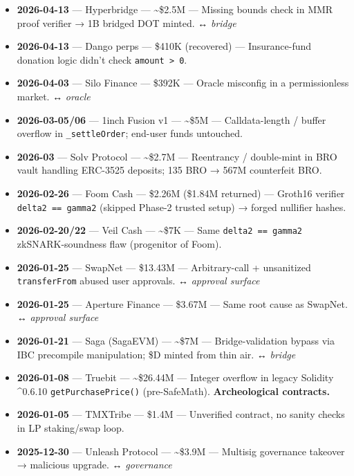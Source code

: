 \begin{itemize}
\tightlist
\item
  \textbf{2026-04-13} --- Hyperbridge --- \textasciitilde\$2.5M --- Missing bounds check in MMR proof verifier → 1B bridged DOT minted. ↔ \emph{bridge}
\item
  \textbf{2026-04-13} --- Dango perps --- \$410K (recovered) --- Insurance-fund donation logic didn't check \texttt{amount\ \textgreater{}\ 0}.
\item
  \textbf{2026-04-03} --- Silo Finance --- \$392K --- Oracle misconfig in a permissionless market. ↔ \emph{oracle}
\item
  \textbf{2026-03-05/06} --- 1inch Fusion v1 --- \textasciitilde\$5M --- Calldata-length / buffer overflow in \texttt{\_settleOrder}; end-user funds untouched.
\item
  \textbf{2026-03} --- Solv Protocol --- \textasciitilde\$2.7M --- Reentrancy / double-mint in BRO vault handling ERC-3525 deposits; 135 BRO → 567M counterfeit BRO.
\item
  \textbf{2026-02-26} --- Foom Cash --- \$2.26M (\$1.84M returned) --- Groth16 verifier \texttt{delta2\ ==\ gamma2} (skipped Phase-2 trusted setup) → forged nullifier hashes.
\item
  \textbf{2026-02-20/22} --- Veil Cash --- \textasciitilde\$7K --- Same \texttt{delta2\ ==\ gamma2} zkSNARK-soundness flaw (progenitor of Foom).
\item
  \textbf{2026-01-25} --- SwapNet --- \$13.43M --- Arbitrary-call + unsanitized \texttt{transferFrom} abused user approvals. ↔ \emph{approval surface}
\item
  \textbf{2026-01-25} --- Aperture Finance --- \$3.67M --- Same root cause as SwapNet. ↔ \emph{approval surface}
\item
  \textbf{2026-01-21} --- Saga (SagaEVM) --- \textasciitilde\$7M --- Bridge-validation bypass via IBC precompile manipulation; \$D minted from thin air. ↔ \emph{bridge}
\item
  \textbf{2026-01-08} --- Truebit --- \textasciitilde\$26.44M --- Integer overflow in legacy Solidity \^{}0.6.10 \texttt{getPurchasePrice()} (pre-SafeMath). \textbf{Archeological contracts.}
\item
  \textbf{2026-01-05} --- TMXTribe --- \$1.4M --- Unverified contract, no sanity checks in LP staking/swap loop.
\item
  \textbf{2025-12-30} --- Unleash Protocol --- \textasciitilde\$3.9M --- Multisig governance takeover → malicious upgrade. ↔ \emph{governance}

\end{itemize}
